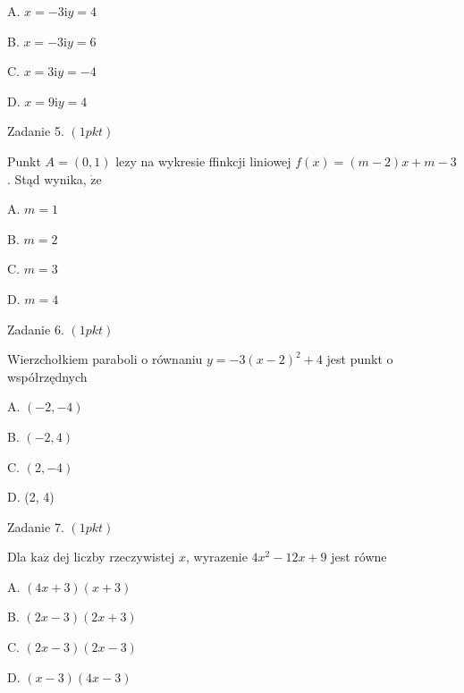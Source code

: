 \documentclass[a4paper,12pt]{article}
\begin{document}
A. $x=-3 \mathrm{i}y=4$

B. $x=-3 \mathrm{i}y=6$

C. $x=3 \mathrm{i}y=-4$

D. $x=9 \mathrm{i}y=4$

Zadanie 5. $(1pkt)$

Punkt $A=(0,1)$ lezy na wykresie ffinkcji liniowej $f(x)=(m-2)x+m-3$. Stąd wynika, $\dot{\mathrm{z}}\mathrm{e}$

A. $m=1$

B. $m=2$

C. $m=3$

D. $m=4$

Zadanie 6. $(1pkt)$

Wierzchołkiem paraboli o równaniu $y=-3(x-2)^{2}+4$ jest punkt o współrzędnych

A. $(-2,-4)$

B. $(-2,4)$

C. $(2,-4)$

D. (2, 4)

Zadanie 7. $(1pkt)$

Dla $\mathrm{k}\mathrm{a}\dot{\mathrm{z}}$ dej liczby rzeczywistej $x$, wyrazenie $4x^{2}-12x+9$ jest równe

A. $(4x+3)(x+3)$

B. $(2x-3)(2x+3)$

C. $(2x-3)(2x-3)$

D. $(x-3)(4x-3)$
\end{document}
